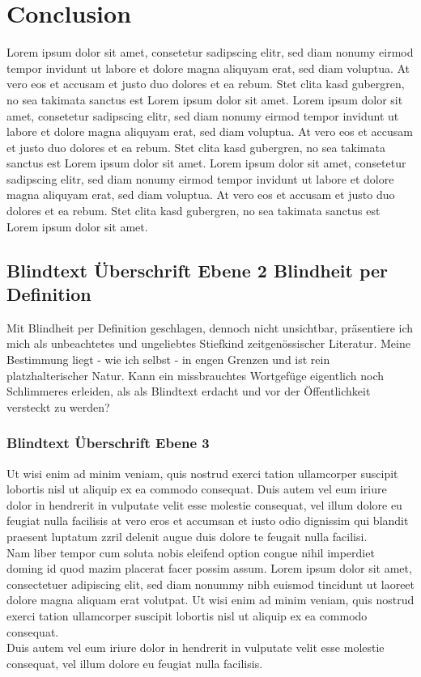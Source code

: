 \documentclass[
	ngerman,
	ruledheaders=section,%
	class=report,%
	thesis={type=bachelor},%
	accentcolor=1b,%
	custommargins=true,%
	marginpar=false,%
	parskip=half-,%
	fontsize=11pt,%
	DIV=14,
]{tudapub}
\begin{document}
\chapter{Conclusion}
Lorem ipsum dolor sit amet, consetetur sadipscing elitr, sed diam nonumy eirmod tempor invidunt ut labore et dolore magna aliquyam erat, sed diam voluptua. At vero eos et accusam et justo duo dolores et ea rebum. Stet clita kasd gubergren, no sea takimata sanctus est Lorem ipsum dolor sit amet. Lorem ipsum dolor sit amet, consetetur sadipscing elitr, sed diam nonumy eirmod tempor invidunt ut labore et dolore magna aliquyam erat, sed diam voluptua. At vero eos et accusam et justo duo dolores et ea rebum. Stet clita kasd gubergren, no sea takimata sanctus est Lorem ipsum dolor sit amet. Lorem ipsum dolor sit amet, consetetur sadipscing elitr, sed diam nonumy eirmod tempor invidunt ut labore et dolore magna aliquyam erat, sed diam voluptua. At vero eos et accusam et justo duo dolores et ea rebum. Stet clita kasd gubergren, no sea takimata sanctus est Lorem ipsum dolor sit amet.
\section{Blindtext Überschrift Ebene 2 Blindheit per Definition}
Mit Blindheit per Definition geschlagen, dennoch nicht unsichtbar, präsentiere ich mich als unbeachtetes und ungeliebtes Stiefkind zeitgenössischer Literatur. Meine Bestimmung liegt - wie ich selbst - in engen Grenzen und ist rein platzhalterischer Natur. Kann ein missbrauchtes Wortgefüge eigentlich noch Schlimmeres erleiden, als als Blindtext erdacht und vor der Öffentlichkeit versteckt zu werden?
\subsection{Blindtext Überschrift Ebene 3}
Ut wisi enim ad minim veniam, quis nostrud exerci tation ullamcorper suscipit lobortis nisl ut aliquip ex ea commodo consequat. Duis autem vel eum iriure dolor in hendrerit in vulputate velit esse molestie consequat, vel illum dolore eu feugiat nulla facilisis at vero eros et accumsan et iusto odio dignissim qui blandit praesent luptatum zzril delenit augue duis dolore te feugait nulla facilisi.\\
Nam liber tempor cum soluta nobis eleifend option congue nihil imperdiet doming id quod mazim placerat facer possim assum. Lorem ipsum dolor sit amet, consectetuer adipiscing elit, sed diam nonummy nibh euismod tincidunt ut laoreet dolore magna aliquam erat volutpat. Ut wisi enim ad minim veniam, quis nostrud exerci tation ullamcorper suscipit lobortis nisl ut aliquip ex ea commodo consequat.\\
Duis autem vel eum iriure dolor in hendrerit in vulputate velit esse molestie consequat, vel illum dolore eu feugiat nulla facilisis.
\end{document}
